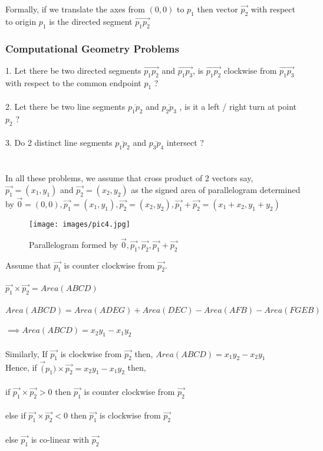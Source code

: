 \documentclass{article}
\begin{document}
    Formally, if we translate the axes from $(0,0)$ to $p_{1}$ then vector $\Vec{p_{2}}$ with respect to origin $p_{1}$ is the directed segment $\overrightarrow{p_{1} p_{2}}$

    \subsubsection{Computational Geometry Problems}
    1. Let there be two directed segments $\overrightarrow{p_{1} p_{2}}$ and $\overrightarrow{p_{1} p_{3}}$, is $\overrightarrow{p_{1} p_{2}}$ clockwise from $\overrightarrow{p_{1} p_{3}}$ with respect to the common endpoint $p_{1}$ ? \\ \\
    2. Let there be two line segments $\overline{p_{1} p_{2}}$ and $\overline{p_{2} p_{3}}$ , is it a left / right turn at point $p_{2}$ ? \\ \\
    3. Do 2 distinct line segments $\overline{p_{1} p_{2}}$ and $\overline{p_{3} p_{4}}$ intersect ? \\ \\ \\
    In all these problems, we assume that cross product of 2 vectors say, $\Vec{p_{1}}=(x_{1},y_{1})$ and $\Vec{p_{2}}=(x_{2},y_{2})$ as the signed area of parallelogram determined by $\Vec{0}=(0,0), \Vec{p_{1}}=(x_{1},y_{1}), \Vec{p_{2}}=(x_{2},y_{2}), \Vec{p_{1}}+\Vec{p_{2}}=(x_{1}+x_{2},y_{1}+y_{2})$ \\ 

    \begin{figure}[h]
    \caption{Parallelogram formed by $\Vec{0}, \Vec{p_{1}}, \Vec{p_{2}}, \Vec{p_{1}}+\Vec{p_{2}}$}
    \centering
    \texttt{[image: images/pic4.jpg]}
    \end{figure}

    Assume that  $ \Vec{p_{1}} $ is counter clockwise from $ \Vec{p_{2}} $. \\ \\
    $ \Vec{p_{1}} \times \Vec{p_{2}} = Area(ABCD)$ \\ \\
    $ Area(ABCD) = Area(ADEG) + Area(DEC) - Area(AFB) - Area(FGEB) $ \\ \\
    $ \implies Area(ABCD) = x_{2}y_{1} - x_{1}y_{2} $ \\ \\
    Similarly, If $ \Vec{p_{1}} $ is clockwise from $ \Vec{p_{2}} $ then, $ Area(ABCD) = x_{1}y_{2} - x_{2}y_{1} $ \\
    Hence, if $\Vec(p_{1}) \times \Vec{p_{2}} = x_{2}y_{1} - x_{1}y_{2} $ then, \\ \\
    if $\Vec{p_{1}} \times \Vec{p_{2}} > 0 $ then $ \Vec{p_{1}}$ is counter clockwise from $\Vec{p_{2}}$ \\ \\
    else if $\Vec{p_{1}} \times \Vec{p_{2}} < 0 $ then $ \Vec{p_{1}}$ is clockwise from $\Vec{p_{2}}$ \\ \\
    else $\Vec{p_{1}}$ is co-linear with $\Vec{p_{2}}$ \\
\end{document}
